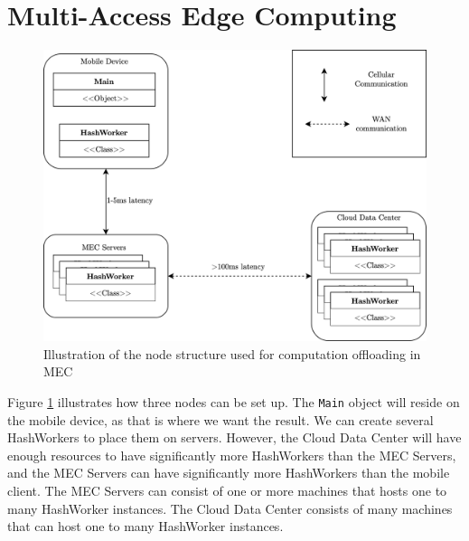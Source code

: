 
\section{Multi-Access Edge Computing}

\begin{figure}[t]
    \centering
    \includegraphics[scale=1]{chapters/implementation/figures/MEC_implementation.png}
    \caption{Illustration of the node structure used for computation offloading in MEC}
    \label{fig:MEC_implementation}
\end{figure}
Figure \ref{fig:MEC_implementation} illustrates how three nodes can be set up. The \verb|Main| object will reside on the mobile device, as that is where we want the result. We can create several HashWorkers to place them on servers. However, the Cloud Data Center will have enough resources to have significantly more HashWorkers than the MEC Servers, and the MEC Servers can have significantly more HashWorkers than the mobile client. The MEC Servers can consist of one or more machines that hosts one to many HashWorker instances. The Cloud Data Center consists of many machines that can host one to many HashWorker instances.





